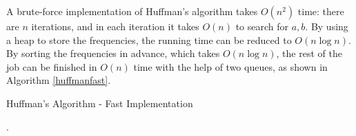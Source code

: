 A brute-force implementation of Huffman's algorithm takes $O(n^2)$ time: there are $n$ iterations, and in each iteration it takes $O(n)$ to search for $a,b$. By using a heap to store the frequencies, the running time can be reduced to $O(n\log n)$. By sorting the frequencies in advance, which takes $O(n\log n)$, the rest of the job can be finished in $O(n)$ time with the help of two queues, as shown in Algorithm \ref{huffmanfast}.
\begin{algorithm}[ht]
\caption{Huffman's Algorithm - Fast Implementation}\label{huffmanfast}
\begin{algorithmic}[1]
.
\EndWhile
{}
\EndFunction
\end{algorithmic}
\end{algorithm}

\ifx\PREAMBLE\undefined

\fi